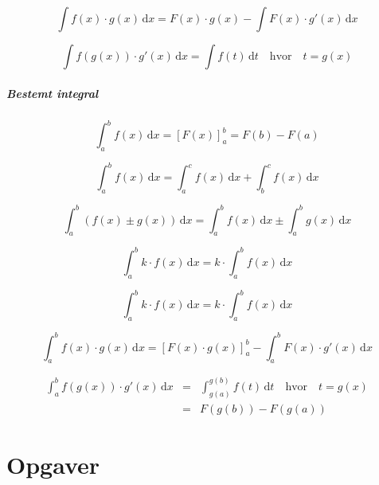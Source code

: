 \documentclass[11pt,a5paper,fleqn,leqno]{book}
\begin{document}
\begin{equation}
\int f(x) \cdot g(x)\, \mathrm{d}x = F(x) \cdot g(x) -  \int F(x) \cdot g'(x)\, \mathrm{d}x
\end{equation}

\begin{equation}
\int f(g(x)) \cdot g'(x)\, \mathrm{d}x = \int f(t)\, \mathrm{d}t \quad \mbox{hvor} \quad t = g(x)
\end{equation}

\paragraph{Bestemt integral}

\begin{equation}
\int_a^b f(x)\, \mathrm{d}x = \left[F(x)\right]_a^b = F(b) - F(a)
\end{equation}

\begin{equation}
\int_a^b f(x)\, \mathrm{d}x = \int_a^c f(x)\, \mathrm{d}x + \int_b^c f(x)\, \mathrm{d}x
\end{equation}

\begin{equation}
\int_a^b \left(f(x) \pm g(x)\right)\, \mathrm{d}x = \int_a^b f(x)\, \mathrm{d}x \pm \int_a^b g(x)\, \mathrm{d}x
\end{equation}

\begin{equation}
\int_a^b k \cdot f(x)\, \mathrm{d}x = k \cdot \int_a^b f(x)\, \mathrm{d}x
\end{equation}

\begin{equation}
\int_a^b k \cdot f(x)\, \mathrm{d}x = k \cdot \int_a^b f(x)\, \mathrm{d}x
\end{equation}

\begin{equation}
\int_a^b f(x) \cdot g(x)\, \mathrm{d}x = \left[F(x) \cdot g(x) \right]_a^b - \int_a^b F(x) \cdot g'(x)\, \mathrm{d}x
\end{equation}

\begin{eqnarray}
\int_a^b f(g(x)) \cdot g'(x)\, \mathrm{d}x & = & \int_{g(a)}^{g(b)} f(t)\, \mathrm{d}t  \quad \mbox{hvor} \quad t = g(x) \\
 & = & F(g(b)) - F(g(a)) \nonumber
\end{eqnarray}

\chapter{Opgaver} \label{ch:Opgaver}
\end{document}
